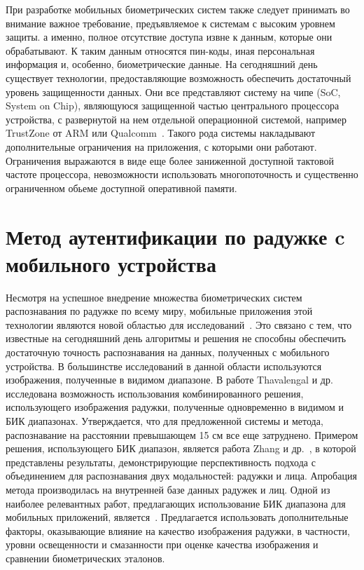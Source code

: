 При разработке мобильных биометрических систем также следует принимать во внимание важное требование, предъявляемое к системам с высоким уровнем защиты. а именно, полное отсутствие доступа извне к данным, которые они обрабатывают. К таким данным относятся пин-коды, иная персональная информация и, особенно, биометрические данные. На сегодняшний день существует технологии, предоставляющие возможность обеспечить достаточный уровень защищенности данных. Они все представляют систему на чипе (SoC, System on Chip), являющуюся защищенной частью центрального процессора устройства, с развернутой на нем отдельной операционной системой, например TrustZone от ARM или Qualcomm~\cite{arm}. Такого рода системы накладывают дополнительные ограничения на приложения, с которыми они работают. Ограничения выражаются в виде еще более заниженной доступной тактовой частоте процессора, невозможности использовать многопоточность и существенно ограниченном обьеме доступной оперативной памяти.

\section{Метод аутентификации по радужке c мобильного устройства}
\label{sec:auth_method}

Несмотря на успешное внедрение множества биометрических систем распознавания по радужке по всему миру, мобильные приложения этой технологии являются новой областью для исследований~\cite{btas_competition_2016,brief_survey_2014}. Это связано с тем, что известные на сегодняшний день алгоритмы и решения не способны обеспечить достаточную точность распознавания на данных, полученных с мобильного устройства. В большинстве исследований в данной области используются изображения, полученные в видимом диапазоне\cite{barra_2015,demarsico_2014,raja_2015}. В работе Thavalengal и др.~\cite{thavalengal_2015} исследована возможность использования комбинированного решения, использующего изображения радужки, полученные одновременно в видимом и БИК диапазонах. Утверждается, что для предложенной системы и метода, распознавание на расстоянии превышающем 15 см все еще затруднено. Примером решения, использующего БИК диапазон, является работа Zhang и др.~\cite{zhang_2015}, в которой представлены результаты, демонстрирующие перспективность подхода с объединением для распознавания двух модальностей: радужки и лица. Апробация метода производилась на внутренней базе данных радужек и лиц. Одной из наиболее релевантных работ, предлагающих использование БИК диапазона для мобильных приложений, является~\cite{jeong_2005}. Предлагается использовать дополнительные факторы, оказывающие влияние на качество изображения радужки, в частности, уровни освещенности и смазанности при оценке качества изображения и сравнении биометрических эталонов.

